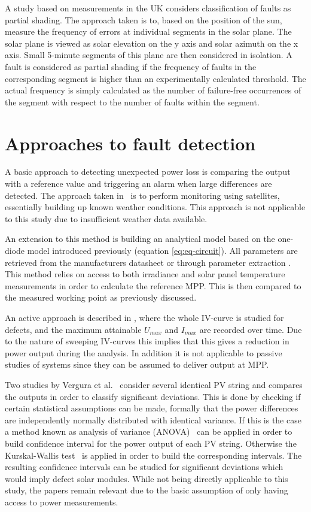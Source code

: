 A study based on measurements in the UK \cite{Firth2010} considers classification of faults as partial shading.
The approach taken is to, based on the position of the sun, measure the frequency of errors at individual segments in the solar plane.
The solar plane is viewed as solar elevation on the y axis and solar azimuth on the x axis.
Small 5-minute segments of this plane are then considered in isolation.
A fault is considered as partial shading if the frequency of faults in the corresponding segment is higher than an experimentally calculated threshold.
The actual frequency is simply calculated as the number of failure-free occurrences of the segment with respect to the number of faults within the segment.

\clearpage
\section{Approaches to fault detection}
A basic approach to detecting unexpected power loss is comparing the output with a reference value and triggering an alarm when large differences are detected.
The approach taken in~\cite{Stettler2005} is to perform monitoring using satellites, essentially building up known weather conditions.
This approach is not applicable to this study due to insufficient weather data available.

An extension to this method is building an analytical model \cite{Chouder2010,Raina2013,Chao2008}
based on the one-diode model introduced previously (equation \ref{eq:eq-circuit}).
All parameters are retrieved from the manufacturers datasheet or through parameter extraction \cite{Eicker2005,Chouder2009,Walker2001}.
This method relies on access to both irradiance and solar panel temperature measurements in order to calculate the reference MPP.
This is then compared to the measured working point as previously discussed.

An active approach is described in \cite{Meyer2004}, where the whole IV-curve is studied for defects, and the maximum attainable $U_{max}$ and $I_{max}$ are recorded over time.
Due to the nature of sweeping IV-curves this implies that this gives a reduction in power output during the analysis.
In addition it is not applicable to passive studies of systems since they can be assumed to deliver output at MPP.

Two studies by Vergura et al.~\cite{Vergura2008,Vergura2009} consider several identical PV string and compares the outputs in order to classify significant deviations.
This is done by checking if certain statistical assumptions can be made, formally that the power differences are independently normally distributed with identical variance.
If this is the case a method known as analysis of variance (ANOVA)~\cite{Vergura2009} can be applied in order to build confidence interval for the power output of each PV string.
Otherwise the Kurskal-Wallis test~\cite{Vergura2009} is applied in order to build the corresponding intervals.
The resulting confidence intervals can be studied for significant deviations which would imply defect solar modules.
While not being directly applicable to this study, the papers remain relevant due to the basic assumption of only having access to power measurements.


